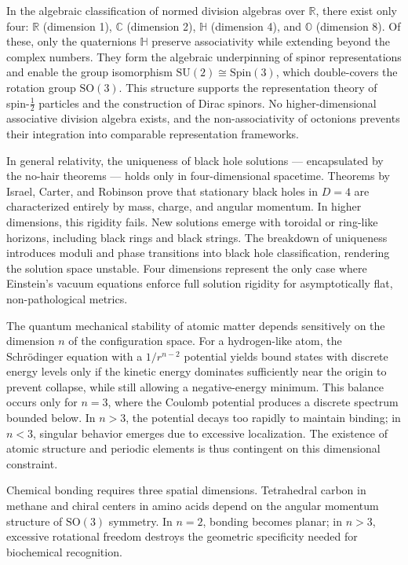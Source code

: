 In the algebraic classification of normed division algebras over $\mathbb{R}$, there exist only four: $\mathbb{R}$ (dimension 1), $\mathbb{C}$ (dimension 2), $\mathbb{H}$ (dimension 4), and $\mathbb{O}$ (dimension 8). Of these, only the quaternions $\mathbb{H}$ preserve associativity while extending beyond the complex numbers. They form the algebraic underpinning of spinor representations and enable the group isomorphism $\mathrm{SU}(2) \cong \mathrm{Spin}(3)$, which double-covers the rotation group $\mathrm{SO}(3)$. This structure supports the representation theory of spin-$\tfrac{1}{2}$ particles and the construction of Dirac spinors. No higher-dimensional associative division algebra exists, and the non-associativity of octonions prevents their integration into comparable representation frameworks.

In general relativity, the uniqueness of black hole solutions — encapsulated by the no-hair theorems — holds only in four-dimensional spacetime. Theorems by Israel, Carter, and Robinson prove that stationary black holes in $D=4$ are characterized entirely by mass, charge, and angular momentum. In higher dimensions, this rigidity fails. New solutions emerge with toroidal or ring-like horizons, including black rings and black strings. The breakdown of uniqueness introduces moduli and phase transitions into black hole classification, rendering the solution space unstable. Four dimensions represent the only case where Einstein’s vacuum equations enforce full solution rigidity for asymptotically flat, non-pathological metrics.

The quantum mechanical stability of atomic matter depends sensitively on the dimension $n$ of the configuration space. For a hydrogen-like atom, the Schrödinger equation with a $1/r^{n-2}$ potential yields bound states with discrete energy levels only if the kinetic energy dominates sufficiently near the origin to prevent collapse, while still allowing a negative-energy minimum. This balance occurs only for $n=3$, where the Coulomb potential produces a discrete spectrum bounded below. In $n>3$, the potential decays too rapidly to maintain binding; in $n<3$, singular behavior emerges due to excessive localization. The existence of atomic structure and periodic elements is thus contingent on this dimensional constraint.

Chemical bonding requires three spatial dimensions. Tetrahedral carbon in methane and chiral centers in amino acids depend on the angular momentum structure of $\mathrm{SO}(3)$ symmetry. In $n=2$, bonding becomes planar; in $n>3$, excessive rotational freedom destroys the geometric specificity needed for biochemical recognition.

